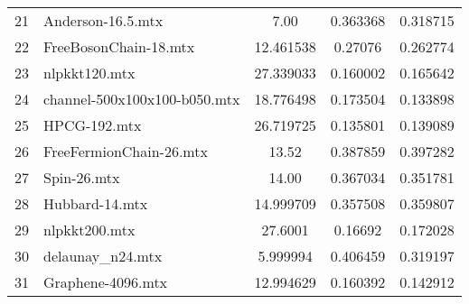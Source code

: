 \begin{tabular}{|l|l|S[round-mode=places,round-precision=2]|S[round-mode=places,round-precision=4]|S[round-mode=places,round-precision=4]|}
{21}& {	Anderson-16.5.mtx             }	& 7.00	& 0.363368	& 0.318715	\\
{22}& {	FreeBosonChain-18.mtx         }	& 12.461538	& 0.27076	& 0.262774	\\
{23}& {	nlpkkt120.mtx                 }	& 27.339033	& 0.160002	& 0.165642	\\
{24}& {	channel-500x100x100-b050.mtx  }	& 18.776498	& 0.173504	& 0.133898	\\
{25}& {	HPCG-192.mtx                  }	& 26.719725	& 0.135801	& 0.139089	\\
{26}& {	FreeFermionChain-26.mtx       }	& 13.52	& 0.387859	& 0.397282	\\
{27}& {	Spin-26.mtx                   }	& 14.00	& 0.367034	& 0.351781	\\
{28}& {	Hubbard-14.mtx                }	& 14.999709	& 0.357508	& 0.359807	\\
{29}& {	nlpkkt200.mtx                 }	& 27.6001	& 0.16692	& 0.172028	\\
{30}& {	delaunay\_n24.mtx              }	& 5.999994	& 0.406459	& 0.319197	\\
{31}& {	Graphene-4096.mtx             }	& 12.994629	& 0.160392	& 0.142912	\\
\bottomrule
\end{tabular}


